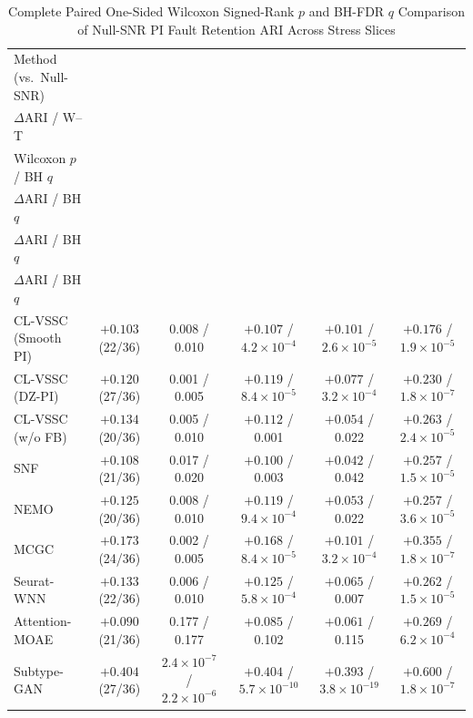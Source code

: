 \begin{table}[t]
\centering
\caption{Complete Paired One-Sided Wilcoxon Signed-Rank $p$ and BH-FDR $q$ Comparison of Null-SNR PI Fault Retention ARI Across Stress Slices}
\label{tab:p2_stab3}
\scriptsize
\renewcommand{\arraystretch}{1.14}
\setlength{\tabcolsep}{2.2pt}
\begin{tabular}{lccccc}
\toprule
Method (vs.\ Null-SNR) & \shortstack{$\sigma{=}4.0$ ($n{=}36$)\\$\Delta\mathrm{ARI}$ / W--T} & \shortstack{$\sigma{=}4.0$ ($n{=}36$)\\Wilcoxon $p$ / BH $q$} & \shortstack{$\sigma{\in}\{2,4\}$ ($n{=}72$)\\$\Delta\mathrm{ARI}$ / BH $q$} & \shortstack{All $\sigma{>}0$ ($n{=}144$)\\$\Delta\mathrm{ARI}$ / BH $q$} & \shortstack{mRNA+miRNA ($n{=}24$)\\$\Delta\mathrm{ARI}$ / BH $q$} \\
\midrule
CL-VSSC (Smooth PI) & $+0.103$ (22/36) & 0.008 / 0.010 & $+0.107$ / $4.2{\times}10^{-4}$ & $+0.101$ / $2.6{\times}10^{-5}$ & $+0.176$ / $1.9{\times}10^{-5}$ \\
CL-VSSC (DZ-PI) & $+0.120$ (27/36) & 0.001 / 0.005 & $+0.119$ / $8.4{\times}10^{-5}$ & $+0.077$ / $3.2{\times}10^{-4}$ & $+0.230$ / $1.8{\times}10^{-7}$ \\
CL-VSSC (w/o FB) & $+0.134$ (20/36) & 0.005 / 0.010 & $+0.112$ / 0.001 & $+0.054$ / 0.022 & $+0.263$ / $2.4{\times}10^{-5}$ \\
SNF & $+0.108$ (21/36) & 0.017 / 0.020 & $+0.100$ / 0.003 & $+0.042$ / 0.042 & $+0.257$ / $1.5{\times}10^{-5}$ \\
NEMO & $+0.125$ (20/36) & 0.008 / 0.010 & $+0.119$ / $9.4{\times}10^{-4}$ & $+0.053$ / 0.022 & $+0.257$ / $3.6{\times}10^{-5}$ \\
MCGC & $+0.173$ (24/36) & 0.002 / 0.005 & $+0.168$ / $8.4{\times}10^{-5}$ & $+0.101$ / $3.2{\times}10^{-4}$ & $+0.355$ / $1.8{\times}10^{-7}$ \\
Seurat-WNN & $+0.133$ (22/36) & 0.006 / 0.010 & $+0.125$ / $5.8{\times}10^{-4}$ & $+0.065$ / 0.007 & $+0.262$ / $1.5{\times}10^{-5}$ \\
Attention-MOAE & $+0.090$ (21/36) & 0.177 / 0.177 & $+0.085$ / 0.102 & $+0.061$ / 0.115 & $+0.269$ / $6.2{\times}10^{-4}$ \\
Subtype-GAN & $+0.404$ (27/36) & $2.4{\times}10^{-7}$ / $2.2{\times}10^{-6}$ & $+0.404$ / $5.7{\times}10^{-10}$ & $+0.393$ / $3.8{\times}10^{-19}$ & $+0.600$ / $1.8{\times}10^{-7}$ \\
\bottomrule
\end{tabular}
\end{table}
